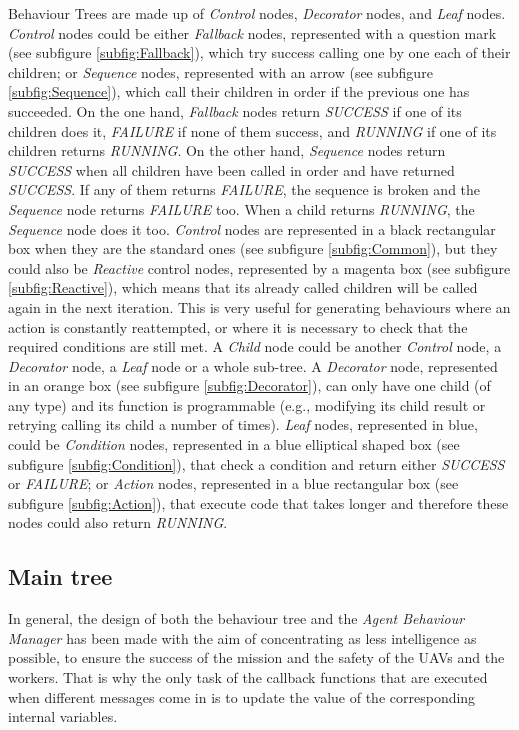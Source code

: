 \documentclass[fontsize=11pt, English=false, Español=true, Myfinal=true, twoside, numbers=noenddot]{scrbook}
\begin{document}
 Behaviour Trees are made up of \emph{Control} nodes, \emph{Decorator} nodes, and \emph{Leaf} nodes. \emph{Control} nodes could be either \emph{Fallback} nodes, represented with a question mark (see subfigure \ref{subfig:Fallback}), which try success calling one by one each of their children; or \emph{Sequence} nodes, represented with an arrow (see subfigure \ref{subfig:Sequence}), which call their children in order if the previous one has succeeded. On the one hand, \emph{Fallback} nodes return \emph{SUCCESS} if one of its children does it, \emph{FAILURE} if none of them success, and \emph{RUNNING} if one of its children returns \emph{RUNNING}. On the other hand, \emph{Sequence} nodes return \emph{SUCCESS} when all children have been called in order and have returned \emph{SUCCESS}. If any of them returns \emph{FAILURE}, the sequence is broken and the \emph{Sequence} node returns \emph{FAILURE} too. When a child returns \emph{RUNNING}, the \emph{Sequence} node does it too. \emph{Control} nodes are represented in a black rectangular box when they are the standard ones (see subfigure \ref{subfig:Common}), but they could also be \emph{Reactive} control nodes, represented by a magenta box (see subfigure \ref{subfig:Reactive}), which means that its already called children will be called again in the next iteration. This is very useful for generating behaviours where an action is constantly reattempted, or where it is necessary to check that the required conditions are still met. A \emph{Child} node could be another \emph{Control} node, a \emph{Decorator} node, a \emph{Leaf} node or a whole sub-tree. A \emph{Decorator} node, represented in an orange box (see subfigure \ref{subfig:Decorator}), can only have one child (of any type) and its function is programmable (e.g., modifying its child result or retrying calling its child a number of times). \emph{Leaf} nodes, represented in blue, could be \emph{Condition} nodes, represented in a blue elliptical shaped box (see subfigure \ref{subfig:Condition}), that check a condition and return either \emph{SUCCESS} or \emph{FAILURE}; or \emph{Action} nodes, represented in a blue rectangular box (see subfigure \ref{subfig:Action}), that execute code that takes longer and therefore these nodes could also return \emph{RUNNING}.

\subsection{Main tree}
\label{sec:MainTree}
In general, the design of both the behaviour tree and the \emph{Agent Behaviour Manager} has been made with the aim of concentrating as less intelligence as possible, to ensure the success of the mission and the safety of the \glspl{UAV} and the workers. That is why the only task of the callback functions that are executed when different messages come in is to update the value of the corresponding internal variables. 
\end{document}
